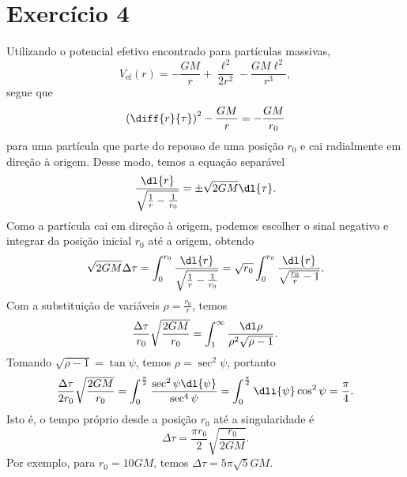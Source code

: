 \section*{Exercício 4}
Utilizando o potencial efetivo encontrado para partículas massivas,
\begin{equation*}
    V_\mathrm{ef}(r) = - \frac{GM}{r} + \frac{\ell^2}{2r^2} - \frac{GM\ell^2}{r^3},
\end{equation*}
segue que
\begin{equation*}
    \left(\diff{r}{\tau}\right)^2 - \frac{GM}{r} = - \frac{GM}{r_0}
\end{equation*}
para uma partícula que parte do repouso de uma posição \(r_0\) e cai radialmente em direção à origem. Desse modo, temos a equação separável
\begin{equation*}
    \frac{\dl{r}}{\sqrt{\frac1r - \frac1{r_0}}} = \pm\sqrt{2GM} \dl{\tau}.
\end{equation*}
Como a partícula cai em direção à origem, podemos escolher o sinal negativo e integrar da posição inicial \(r_0\) até a origem, obtendo
\begin{equation*}
    \sqrt{2GM} \Delta\tau = \int_{0}^{r_0} \frac{\dl{r}}{\sqrt{\frac1r - \frac1{r_0}}} = \sqrt{r_0} \int_{0}^{r_0} \frac{\dl{r}}{\sqrt{\frac{r_0}{r} - 1}}.
\end{equation*}
Com a substituição de variáveis \(\rho = \frac{r_0}{r}\), temos
\begin{equation*}
    \frac{\Delta\tau}{r_0}\sqrt{\frac{2GM}{r_0}} = \int_1^\infty\frac{\dl\rho}{\rho^2\sqrt{\rho - 1}}.
\end{equation*}
Tomando \(\sqrt{\rho - 1} = \tan\psi\), temos \(\rho = \sec^2\psi\), portanto
\begin{equation*}
    \frac{\Delta\tau}{2r_0}\sqrt{\frac{2GM}{r_0}} = \int_{0}^\frac\pi2 \frac{\sec^2\psi\dl{\psi}}{\sec^4\psi} = \int_{0}^{\frac\pi2} \dli{\psi}\cos^2\psi = \frac{\pi}{4}.
\end{equation*}
Isto é, o tempo próprio desde a posição \(r_0\) até a singularidade é
\begin{equation*}
    \Delta \tau = \frac{\pi r_0}{2}\sqrt{\frac{r_0}{2GM}}.
\end{equation*}
Por exemplo, para \(r_0 = 10GM\), temos \(\Delta\tau = 5\pi\sqrt{5}GM\).
